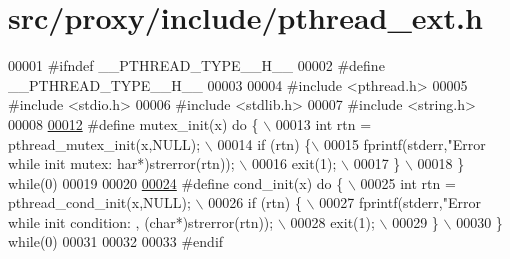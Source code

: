 \hypertarget{pthread__ext_8h_source}{
\section{src/proxy/include/pthread\_\-ext.h}
}

\begin{DoxyCode}
00001 \textcolor{preprocessor}{#ifndef \_\_PTHREAD\_TYPE\_\_H\_\_}
00002 \textcolor{preprocessor}{}\textcolor{preprocessor}{#define \_\_PTHREAD\_TYPE\_\_H\_\_}
00003 \textcolor{preprocessor}{}
00004 \textcolor{preprocessor}{#include <pthread.h>}
00005 \textcolor{preprocessor}{#include <stdio.h>}
00006 \textcolor{preprocessor}{#include <stdlib.h>}
00007 \textcolor{preprocessor}{#include <string.h>}
00008 
\hypertarget{pthread__ext_8h_source_l00012}{}\hyperlink{pthread__ext_8h_a45c94f43dc0e6640ce504b74803841b3}{00012} \textcolor{preprocessor}{#define mutex\_init(x)   do \{                                    \(\backslash\)}
00013 \textcolor{preprocessor}{                         int rtn  = pthread\_mutex\_init(x,NULL); \(\backslash\)}
00014 \textcolor{preprocessor}{                         if (rtn) \{\(\backslash\)}
00015 \textcolor{preprocessor}{                                fprintf(stderr,"Error while init mutex: %
      har*)strerror(rtn));    \(\backslash\)}
00016 \textcolor{preprocessor}{                                exit(1);                        \(\backslash\)}
00017 \textcolor{preprocessor}{                         \}                                      \(\backslash\)}
00018 \textcolor{preprocessor}{                        \} while(0)}
00019 \textcolor{preprocessor}{}
00020 
\hypertarget{pthread__ext_8h_source_l00024}{}\hyperlink{pthread__ext_8h_ac816822b3cc57dd414e08eab2f13bab1}{00024} \textcolor{preprocessor}{#define cond\_init(x)    do \{                                    \(\backslash\)}
00025 \textcolor{preprocessor}{                         int rtn = pthread\_cond\_init(x,NULL);   \(\backslash\)}
00026 \textcolor{preprocessor}{                         if (rtn) \{ \(\backslash\)}
00027 \textcolor{preprocessor}{                                fprintf(stderr,"Error while init condition: %
      , (char*)strerror(rtn));        \(\backslash\)}
00028 \textcolor{preprocessor}{                                exit(1);                        \(\backslash\)}
00029 \textcolor{preprocessor}{                         \}                                      \(\backslash\)}
00030 \textcolor{preprocessor}{                        \} while(0)}
00031 \textcolor{preprocessor}{}
00032 
00033 \textcolor{preprocessor}{#endif}
\end{DoxyCode}
